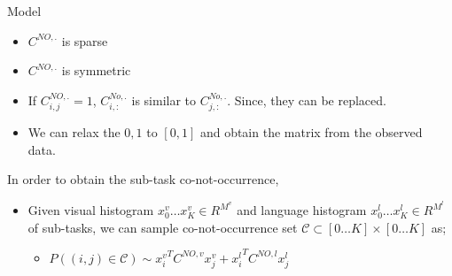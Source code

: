 \begin{frame}{Model}
\begin{itemize}
\item $C^{NO,.}$ is sparse
\item $C^{NO,.}$ is symmetric
\item If $C^{NO,.}_{i,j}=1$, $C^{No,.}_{i,:}$ is similar to  $C^{No,.}_{j,:}$. Since, they can be replaced.
\item We can relax the ${0,1}$ to $[0,1]$ and obtain the matrix from the observed data.
\end{itemize}
In order to obtain the sub-task co-not-occurrence,
\begin{itemize}
\item Given visual histogram $x^v_0 \ldots x^v_K \in R^{M^v}$ and language histogram $x^l_0 \ldots x^l_K \in R^{M^l}$ of sub-tasks, we can sample co-not-occurrence set $\mathcal{C} \subset [0\ldots K]
 \times [0 \ldots K]$ as;
\begin{itemize}
\item $P((i,j) \in \mathcal{C}) \sim {x^v_i}^T C^{NO,v} x^v_j + {x^l_i}^T C^{NO,l} x^l_j$
\end{itemize} 
\end{itemize}
\end{frame}